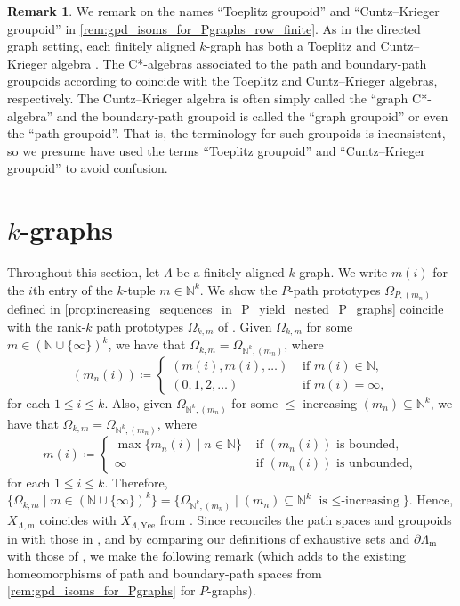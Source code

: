 \documentclass[11pt]{amsart}
\theoremstyle{definition}
\numberwithin{thm}{section}
\numberwithin{equation}{section}
\newtheorem{remark}[thm]{Remark}
\newcommand{\setof}[2]{\{ #1 \mid #2 \}}
\newcommand{\N}{\mathbb{N}}
\newcommand{\ofYeend}{\mathrm{Yee}}
\newcommand{\M}{\mathrm{m}}
\newcommand{\PS}[2]{X_{#2, #1}}
\newcommand{\BPS}[2]{\partial{#2}_{#1}}
\begin{document}
\begin{remark}
We remark on the names ``Toeplitz groupoid'' and ``Cuntz--Krieger groupoid'' in \cref{rem:gpd_isoms_for_Pgraphs_row_finite}.
As in the directed graph setting, each finitely aligned $k$-graph has both a Toeplitz and Cuntz--Krieger algebra \cite[Remark 3.9]{FMY05}. 
The C*-algebras associated to the path and boundary-path groupoids according to \cite{Ren80} coincide with the Toeplitz and Cuntz--Krieger algebras, respectively. 
The Cuntz--Krieger algebra is often simply called the ``graph C*-algebra'' and the boundary-path groupoid is called the ``graph groupoid'' or even the ``path groupoid''.
That is, the terminology for such groupoids is inconsistent, so we presume \cite{RW17} have used the terms ``Toeplitz groupoid'' and ``Cuntz--Krieger groupoid'' to avoid confusion.
\end{remark}

\section{\texorpdfstring{$k$-graphs}{k-graphs}}
\label{sec:k}

Throughout this section, let $\Lambda$ be a finitely aligned $k$-graph.
We write $m(i)$ for the $i$th entry of the $k$-tuple $m \in \N^k$.
We show the $P$-path prototypes $\Omega_{P, (m_n)}$ defined in \cref{prop:increasing_sequences_in_P_yield_nested_P_graphs} coincide with the rank-$k$ path prototypes $\Omega_{k, m}$ of \cite{Yee07}.
Given $\Omega_{k, m}$ for some $m \in (\N \cup \{\infty\})^k$, we have that $\Omega_{k, m} = \Omega_{\N^k, (m_n)}$, where 
\[
(m_n(i)) \coloneqq 
\begin{cases}
(m(i), m(i), \dots) & \text{ if } m(i) \in \N, \\
(0, 1, 2, \dots) & \text{ if } m(i) = \infty,
\end{cases}
\]
for each $1 \leq i \leq k$.
Also, given $\Omega_{\N^k, (m_n)}$ for some $\leq$-increasing $(m_n) \subseteq \N^k$, we have that $\Omega_{k, m} = \Omega_{\N^k, (m_n)}$, where 
\[
m(i) \coloneqq 
\begin{cases}
\max\setof{m_n(i)}{n \in \N} & \text{ if $(m_n(i))$ is bounded,} \\
\infty & \text{ if $(m_n(i))$ is unbounded},
\end{cases}
\]
for each $1 \leq i \leq k$.
Therefore,
\(
\setof{\Omega_{k, m}}{m \in (\N \cup \{\infty\})^k}
= \setof{
\Omega_{\N^k, (m_n)}
}{
(m_n) \subseteq \N^k \text{ is $\leq$-increasing}
}.
\)
Hence, $\PS{\M}{\Lambda}$ coincides with $\PS{\ofYeend}{\Lambda}$ from \cite[Definition 3.1]{Yee07}. 
Since \cite[Examples 4.10(ii)]{Yee07} reconciles the path spaces and groupoids in \cite{Yee07} with those in \cite{FMY05}, and by comparing our definitions of exhaustive sets and $\BPS{\M}{\Lambda}$ with those of \cite{FMY05}, we make the following remark (which adds to the existing homeomorphisms of path and boundary-path spaces from \cref{rem:gpd_isoms_for_Pgraphs} for $P$-graphs).
\end{document}
